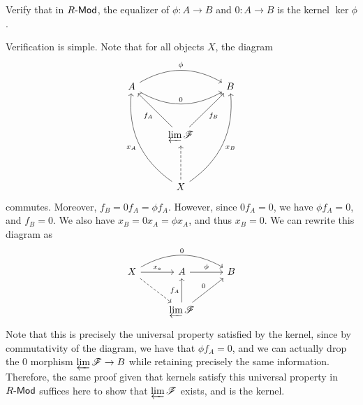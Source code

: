 \documentclass[11pt]{report}
\begin{document}
\begin{exercise}
	Verify that in $R\text{-}\mathsf{Mod} $, the equalizer of $\phi : A \to B$ and $0: A \to B$ is the kernel $\ker \phi $.
\end{exercise}
\begin{solution}
	Verification is simple. Note that for all objects $X$, the diagram
	\[\begin{tikzcd}[row sep = 3.5em, column sep = 2.5em]
		A\arrow[rr, bend left, "\phi "]\arrow[rr, bend right, "0"]&&B\\
									  &\varprojlim \mathscr{F} \arrow[ul, "f_A"]\arrow[ur, "f_B"']\\
									  &X\arrow[luu, bend left, "x_A"]\arrow[u, dashed]\arrow[ruu, bend right, "x_B"']
	\end{tikzcd}\]
	commutes. Moreover, $f_B=0f_A=\phi f_A$. However, since $0f_A=0$, we have $\phi f_A=0$, and $f_B=0$. We also have $x_B=0x_A=\phi x_A$, and thus $x_B=0$. We can rewrite this diagram as
	\[\begin{tikzcd}[row sep = 2.5em, column sep = 2.5em]
		X\arrow[r, "x_a"]\arrow[dr, dashed]\arrow[rr, bend left, "0"]&A\arrow[r, "\phi "]&B\\
									     &\varprojlim \mathscr{F} \arrow[ur, "0"]\arrow[u, "f_A"]
	\end{tikzcd}\]
	Note that this is precisely the universal property satisfied by the kernel, since by commutativity of the diagram, we have that $\phi f_A=0$, and we can actually drop the 0 morphism $\varprojlim \mathscr{F} \to B$ while retaining precisely the same information. Therefore, the same proof given that kernels satisfy this universal property in $R\text{-}\mathsf{Mod} $ suffices here to show that $\varprojlim \mathscr{F} $ exists, and is the kernel.
\end{solution}
\end{document}
